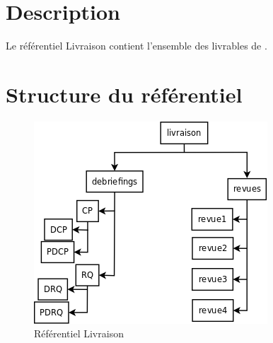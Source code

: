 \section{Description}

Le référentiel Livraison contient l'ensemble des livrables de \nomEquipe{}.

\section{Structure du référentiel}\label{ref_livraison}

\begin{figure}[ht]
         \begin{center}
         \includegraphics[scale=0.6]{images/I_arboLivraison}
         \end{center}
         \caption{Référentiel Livraison}
 \end{figure}






